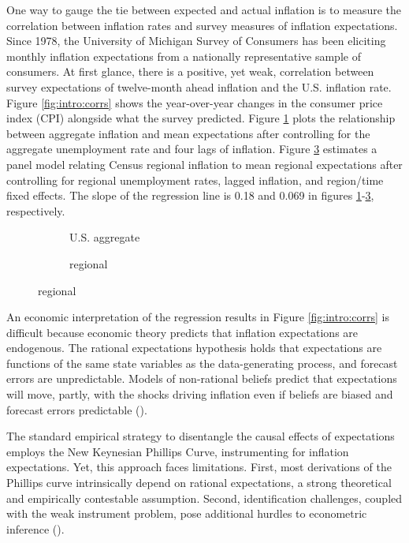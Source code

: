 \documentclass[12pt]{article}
\begin{document}
One way to gauge the tie between expected and actual inflation is to measure the correlation between inflation rates and survey measures of inflation expectations. Since 1978, the University of Michigan Survey of Consumers has been eliciting monthly inflation expectations from a nationally representative sample of consumers. At first glance, there is a positive, yet weak, correlation between survey expectations of twelve-month ahead inflation and the U.S. inflation rate. Figure \ref{fig:intro:corrs} shows the year-over-year changes in the consumer price index (CPI) alongside what the survey predicted. Figure \ref{subfig:intro:us} plots the relationship between aggregate inflation and mean expectations after controlling for the aggregate unemployment rate and four lags of inflation. Figure \ref{subfig:intro:reg} estimates a panel model relating Census regional inflation to mean regional expectations after controlling for regional unemployment rates, lagged inflation, and region/time fixed effects. The slope of the regression line is 0.18 and 0.069 in figures \ref{subfig:intro:us}-\ref{subfig:intro:reg}, respectively.
\begin{figure}
\centering
\caption{Inflation and inflation expectations}\label{fig:intro:corrs}
\begin{subfigure}[t]{0.45\textwidth}
\centering

\caption{U.S. aggregate}\label{subfig:intro:us}
\end{subfigure}
\hfill
\begin{subfigure}[t]{0.45\textwidth}
\centering

\caption{regional}\label{subfig:intro:reg}
\end{subfigure}
\end{figure}

An economic interpretation of the regression results in Figure \ref{fig:intro:corrs} is difficult because economic theory predicts that inflation expectations are endogenous. The rational expectations hypothesis holds that expectations are functions of the same state variables as the data-generating process, and forecast errors are unpredictable. Models of non-rational beliefs predict that expectations will move, partly, with the shocks driving inflation even if beliefs are biased and forecast errors predictable (\cite{SophoclesJME}). 

The standard empirical strategy to disentangle the causal effects of expectations employs the New Keynesian Phillips Curve, instrumenting for inflation expectations.  Yet, this approach faces limitations.  First, most derivations of the Phillips curve intrinsically depend on rational expectations, a strong theoretical and empirically contestable assumption.  Second, identification challenges, coupled with the weak instrument problem, pose additional hurdles to econometric inference (\cite{Stocketal:JEL2014}). 
\end{document}
